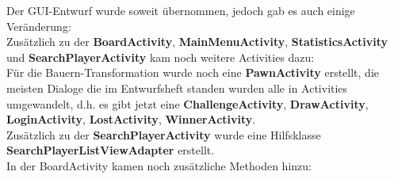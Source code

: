 \documentclass[parskip=full]{scrartcl}
\begin{document}
		Der GUI-Entwurf wurde soweit übernommen, jedoch gab es auch einige Veränderung: \\
		Zusätzlich zu der \textbf{BoardActivity}, \textbf{MainMenuActivity}, \textbf{StatisticsActivity} und \textbf{SearchPlayerActivity} kam noch weitere Activities dazu: \\
Für die Bauern-Transformation wurde noch eine \textbf{PawnActivity} erstellt, die meisten Dialoge die im Entwurfsheft standen wurden alle in Activities umgewandelt, d.h. es gibt jetzt eine \textbf{ChallengeActivity}, \textbf{DrawActivity}, \textbf{LoginActivity}, \textbf{LostActivity}, \textbf{WinnerActivity}. \\ Zusätzlich zu der \textbf{SearchPlayerActivity} wurde eine Hilfsklasse \textbf{SearchPlayerListViewAdapter} erstellt.\\
In der BoardActivity kamen noch zusätzliche Methoden hinzu: 
\end{document}
